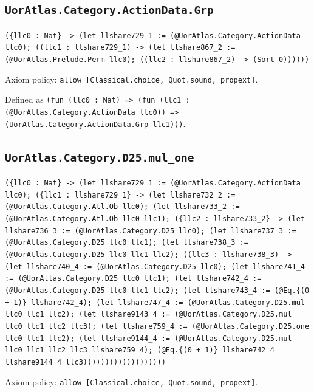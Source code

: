 \documentclass[11pt]{article}
\begin{document}
\subsection*{\texttt{UorAtlas.Category.ActionData.Grp}}
\noindent\texttt{(\{llc0 : Nat\} -> (let llshare729\_1 := (@UorAtlas.Category.ActionData llc0); ((llc1 : llshare729\_1) -> (let llshare867\_2 := (@UorAtlas.Prelude.Perm llc0); ((llc2 : llshare867\_2) -> (Sort 0))))))}\par
\noindent Axiom policy: \texttt{allow [Classical.choice, Quot.sound, propext]}.\par
\noindent Defined as \texttt{(fun (llc0 : Nat) => (fun (llc1 : (@UorAtlas.Category.ActionData llc0)) => (UorAtlas.Category.ActionData.Grp llc1)))}.\par
\subsection*{\texttt{UorAtlas.Category.D25.mul\_one}}
\noindent\texttt{(\{llc0 : Nat\} -> (let llshare729\_1 := (@UorAtlas.Category.ActionData llc0); (\{llc1 : llshare729\_1\} -> (let llshare732\_2 := (@UorAtlas.Category.Atl.Ob llc0); (let llshare733\_2 := (@UorAtlas.Category.Atl.Ob llc0 llc1); (\{llc2 : llshare733\_2\} -> (let llshare736\_3 := (@UorAtlas.Category.D25 llc0); (let llshare737\_3 := (@UorAtlas.Category.D25 llc0 llc1); (let llshare738\_3 := (@UorAtlas.Category.D25 llc0 llc1 llc2); ((llc3 : llshare738\_3) -> (let llshare740\_4 := (@UorAtlas.Category.D25 llc0); (let llshare741\_4 := (@UorAtlas.Category.D25 llc0 llc1); (let llshare742\_4 := (@UorAtlas.Category.D25 llc0 llc1 llc2); (let llshare743\_4 := (@Eq.\{(0 + 1)\} llshare742\_4); (let llshare747\_4 := (@UorAtlas.Category.D25.mul llc0 llc1 llc2); (let llshare9143\_4 := (@UorAtlas.Category.D25.mul llc0 llc1 llc2 llc3); (let llshare759\_4 := (@UorAtlas.Category.D25.one llc0 llc1 llc2); (let llshare9144\_4 := (@UorAtlas.Category.D25.mul llc0 llc1 llc2 llc3 llshare759\_4); (@Eq.\{(0 + 1)\} llshare742\_4 llshare9144\_4 llc3)))))))))))))))))))}\par
\noindent Axiom policy: \texttt{allow [Classical.choice, Quot.sound, propext]}.\par
\end{document}
